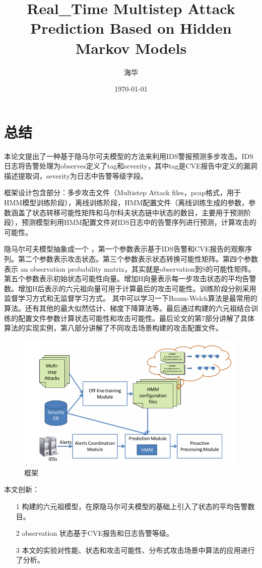 \documentclass[UTF8]{ctexart}
\title{\heiti Real_Time Multistep Attack Prediction Based on Hidden Markov Models}
\author{\kaishu 海华}
\date{\today}
\begin{document}
    \maketitle

    \clearpage

    \section{总结}\label{sec:diyijie}
  	本论文提出了一种基于隐马尔可夫模型的方法来利用IDS警报预测多步攻击。IDS日志将告警处理为observes定义了tag和severity，其中tag是CVE报告中定义的漏洞描述提取词，severity为日志中告警等级字段。

	框架设计包含部分：多步攻击文件（Multistep Attack files，pcap格式，用于HMM模型训练阶段），离线训练阶段，HMM配置文件（离线训练生成的参数，参数涵盖了状态转移可能性矩阵和马尔科夫状态链中状态的数目，主要用于预测阶段），预测模型利用HMM配置文件对IDS日志中的告警序列进行预测，计算攻击的可能性。

	隐马尔可夫模型抽象成一个 ，第一个参数表示基于IDS告警和CVE报告的观察序列。第二个参数表示攻击状态。第三个参数表示状态转换可能性矩阵。第四个参数表示 an observation probability matrix，其实就是observation到S的可能性矩阵。第五个参数表示初始状态可能性向量。增加H向量表示每一步攻击状态的平均告警数。增加H后表示的六元祖向量可用于计算最后的攻击可能性。训练阶段分别采用监督学习方式和无监督学习方式。 其中可以学习一下Baum-Welch算法是最常用的算法。还有其他的最大似然估计、梯度下降算法等。最后通过构建的六元祖结合训练的配置文件参数计算状态可能性和攻击可能性。最后论文的第7部分讲解了具体算法的实现实例，第八部分讲解了不同攻击场景构建的攻击配置文件。
	\begin{figure}[ht]
        \centering
        \includegraphics[scale=0.5]{picture/001.png}
        \caption{框架}
        \label{fig:001}
    \end{figure}

	本文创新：
	\begin{itemize}
	\item[1] 构建的六元祖模型，在原隐马尔可夫模型的基础上引入了状态的平均告警数目。
	\item[2] observation 状态基于CVE报告和日志告警等级。
	\item[3] 本文的实验对性能、状态和攻击可能性、分布式攻击场景中算法的应用进行了分析。
	\end{itemize}
	\clearpage
	
	
\end{document}
